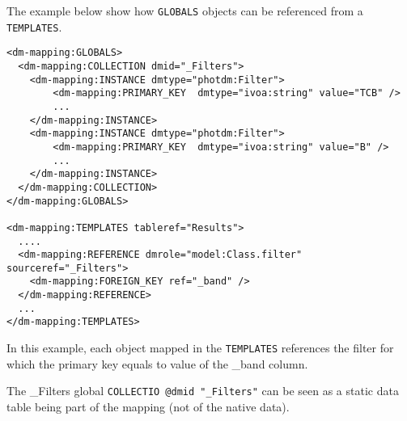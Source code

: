 The example below show how \texttt{GLOBALS} objects can be referenced from a  \texttt{TEMPLATES}. 

\begin{lstlisting}[frame=single,caption={Dynamic reference example},style=XML,basicstyle=\tiny]
<dm-mapping:GLOBALS>
  <dm-mapping:COLLECTION dmid="_Filters">
    <dm-mapping:INSTANCE dmtype="photdm:Filter">
		<dm-mapping:PRIMARY_KEY  dmtype="ivoa:string" value="TCB" />
		...
	</dm-mapping:INSTANCE>
	<dm-mapping:INSTANCE dmtype="photdm:Filter">
		<dm-mapping:PRIMARY_KEY  dmtype="ivoa:string" value="B" />
		...
	</dm-mapping:INSTANCE>
  </dm-mapping:COLLECTION>
</dm-mapping:GLOBALS>

<dm-mapping:TEMPLATES tableref="Results">
  ....
  <dm-mapping:REFERENCE	dmrole="model:Class.filter"	sourceref="_Filters">
    <dm-mapping:FOREIGN_KEY ref="_band" />
  </dm-mapping:REFERENCE>
  ...
</dm-mapping:TEMPLATES>

\end{lstlisting}  

In this example, each object mapped in the \texttt{TEMPLATES} references the filter for which the primary key equals to value of the \_band column.

The \_Filters global \texttt{COLLECTIO \texttt{@dmid} "\_Filters"} can be seen as a static data table being part of the mapping (not of the native data).

